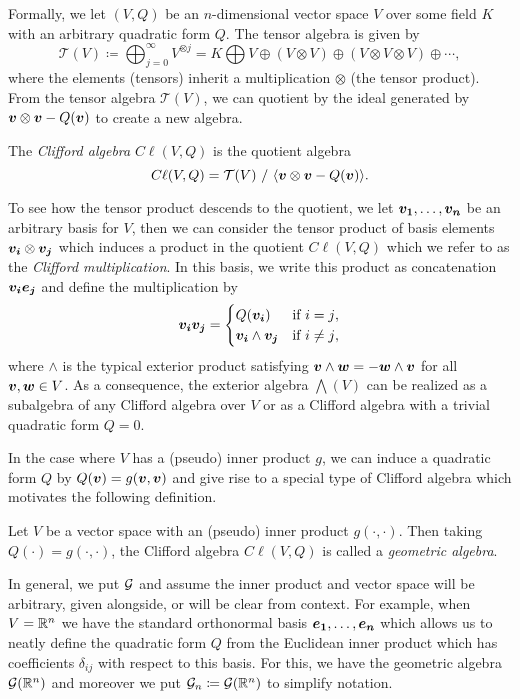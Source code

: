 Formally, we let $(V,Q)$ be an $n$-dimensional vector space $V$ over some field $K$ with an arbitrary quadratic form $Q$.  The tensor algebra is given by
\begin{equation}
\mathcal{T}(V) \coloneqq \bigoplus_{j=0}^\infty V^{\otimes j} = K \bigoplus V \oplus (V\otimes V) \oplus (V\otimes V \otimes V) \oplus \cdots,
\end{equation}
where the elements (tensors) inherit a multiplication $\otimes$ (the tensor product). From the tensor algebra $\mathcal{T}(V)$, we can quotient by the ideal generated by $\boldsymbol{v}\otimes \boldsymbol{v} - Q(\boldsymbol{v})$ to create a new algebra.
\begin{definition}
The \emph{Clifford algebra} $C\ell(V,Q)$ is the quotient algebra
\begin{equation}
C\ell(V,Q) = \mathcal{T}(V) ~ / ~ \langle \boldsymbol{v} \otimes \boldsymbol{v} - Q(\boldsymbol{v}) \rangle.
\end{equation}
\end{definition}
To see how the tensor product descends to the quotient, we let $\boldsymbol{v_1}, \dots, \boldsymbol{v_n}$ be an arbitrary basis for $V$, then we can consider the tensor product of basis elements $\boldsymbol{v_i} \otimes \boldsymbol{v_j}$ which induces a product in the quotient $C\ell(V,Q)$ which we refer to as the \emph{Clifford multiplication}. In this basis, we write this product as concatenation $\boldsymbol{v_i}\boldsymbol{e_j}$ and define the multiplication by
\begin{equation}
\label{eq:clifford_multiplication}
\boldsymbol{v_i} \boldsymbol{v_j} = \begin{cases} Q(\boldsymbol{v_i}) & \textrm{if $i=j$}, \\ \boldsymbol{v_i} \wedge \boldsymbol{v_j} & \textrm{if $i\neq j$},\end{cases}
\end{equation}
where $\wedge$ is the typical exterior product satisfying $\boldsymbol{v}\wedge \boldsymbol{w} = - \boldsymbol{w}\wedge \boldsymbol{v}$ for all $\boldsymbol{v},\boldsymbol{w}\in V$.  As a consequence, the exterior algebra $\bigwedge(V)$ can be realized as a subalgebra of any Clifford algebra over $V$ or as a Clifford algebra with a trivial quadratic form $Q=0$.  

In the case where $V$ has a (pseudo) inner product $g$, we can induce a quadratic form $Q$ by $Q(\boldsymbol{v})=g(\boldsymbol{v},\boldsymbol{v})$ and give rise to a special type of Clifford algebra which motivates the following definition.
\begin{definition}
Let $V$ be a vector space with an (pseudo) inner product $g(\cdot,\cdot)$. Then taking $Q(\cdot) = g(\cdot,\cdot)$, the Clifford algebra $C \ell(V,Q)$ is called a \emph{geometric algebra}.
\end{definition}
In general, we put $\mathcal{G}$ and assume the inner product and vector space will be arbitrary, given alongside, or will be clear from context.  For example, when $V=\mathbb{R}^n$ we have the standard orthonormal basis $\boldsymbol{e_1},\dots,\boldsymbol{e_n}$ which allows us to neatly define the quadratic form $Q$ from the Euclidean inner product which has coefficients $\delta_{ij}$ with respect to this basis. For this, we have the geometric algebra $\mathcal{G}(\mathbb{R}^n)$ and moreover we put $\mathcal{G}_n \coloneqq \mathcal{G}(\mathbb{R}^n)$ to simplify notation. 

